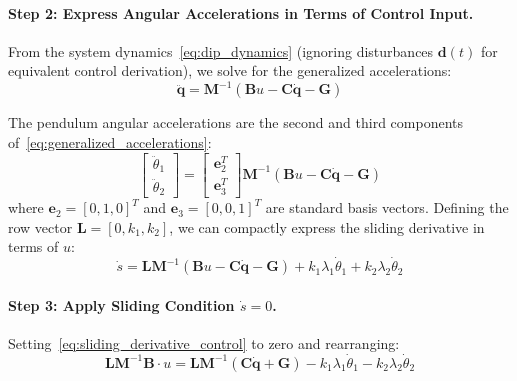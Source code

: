 \paragraph{Step 2: Express Angular Accelerations in Terms of Control Input.}
From the system dynamics~\eqref{eq:dip_dynamics} (ignoring disturbances $\mathbf{d}(t)$ for equivalent control derivation), we solve for the generalized accelerations:
\begin{equation}
\label{eq:generalized_accelerations}
\ddot{\mathbf{q}} = \mathbf{M}^{-1}(\mathbf{B}u - \mathbf{C}\dot{\mathbf{q}} - \mathbf{G})
\end{equation}

The pendulum angular accelerations are the second and third components of~\eqref{eq:generalized_accelerations}:
\begin{equation}
\label{eq:angular_accelerations}
\begin{bmatrix} \ddot{\theta}_1 \\ \ddot{\theta}_2 \end{bmatrix} = \begin{bmatrix} \mathbf{e}_2^T \\ \mathbf{e}_3^T \end{bmatrix} \mathbf{M}^{-1}(\mathbf{B}u - \mathbf{C}\dot{\mathbf{q}} - \mathbf{G})
\end{equation}
where $\mathbf{e}_2 = [0, 1, 0]^T$ and $\mathbf{e}_3 = [0, 0, 1]^T$ are standard basis vectors. Defining the row vector $\mathbf{L} = [0, k_1, k_2]$, we can compactly express the sliding derivative in terms of $u$:
\begin{equation}
\label{eq:sliding_derivative_control}
\dot{s} = \mathbf{L}\mathbf{M}^{-1}(\mathbf{B}u - \mathbf{C}\dot{\mathbf{q}} - \mathbf{G}) + k_1\lambda_1\dot{\theta}_1 + k_2\lambda_2\dot{\theta}_2
\end{equation}

\paragraph{Step 3: Apply Sliding Condition $\dot{s} = 0$.}
Setting~\eqref{eq:sliding_derivative_control} to zero and rearranging:
\begin{equation}
\label{eq:sliding_condition_applied}
\mathbf{L}\mathbf{M}^{-1}\mathbf{B} \cdot u = \mathbf{L}\mathbf{M}^{-1}(\mathbf{C}\dot{\mathbf{q}} + \mathbf{G}) - k_1\lambda_1\dot{\theta}_1 - k_2\lambda_2\dot{\theta}_2
\end{equation}

